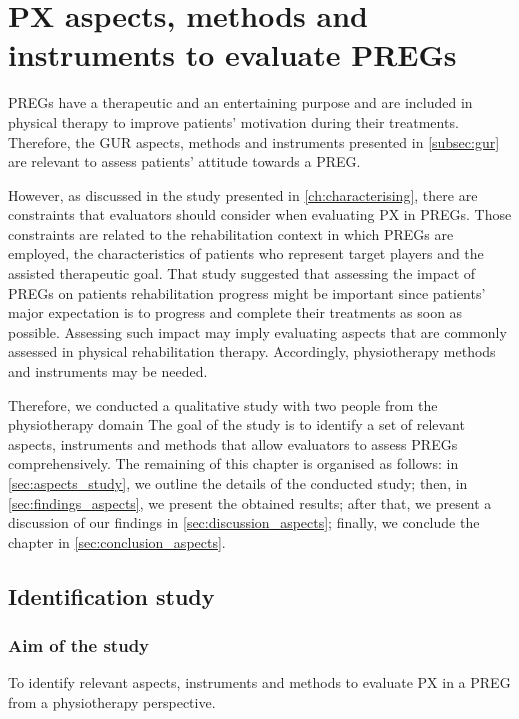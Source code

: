 \chapter{PX aspects, methods and instruments to evaluate PREGs}
\label{ch:aspects}

\acp{PREG} have a therapeutic and an entertaining purpose and are included in physical therapy to improve patients' motivation during their treatments. Therefore, the \ac{GUR} aspects, methods and instruments presented in \autoref{subsec:gur} are relevant to assess patients' attitude towards a \ac{PREG}.

However, as discussed in the study presented in \autoref{ch:characterising}, there are constraints that evaluators should consider when evaluating \ac{PX} in \acp{PREG}. Those constraints are related to the rehabilitation context in which \acp{PREG} are employed, the characteristics of patients who represent target players and the assisted therapeutic goal. That study suggested that assessing the impact of \acp{PREG} on patients rehabilitation progress might be important since patients' major expectation is to progress and complete their treatments as soon as possible. Assessing such impact may imply evaluating aspects that are commonly assessed in physical rehabilitation therapy. Accordingly, physiotherapy methods and instruments may be needed.

Therefore, we conducted a qualitative study with two people from the physiotherapy domain The goal of the study is to identify a set of relevant aspects, instruments and methods that allow evaluators to assess \acp{PREG} comprehensively. The remaining of this chapter is organised as follows: in \autoref{sec:aspects_study}, we outline the details of the conducted study; then, in \autoref{sec:findings_aspects}, we present the obtained results; after that, we present a discussion of our findings in \autoref{sec:discussion_aspects}; finally, we conclude the chapter in \autoref{sec:conclusion_aspects}.

\section{Identification study}\label{sec:aspects_study}
\subsection{Aim of the study}
To identify relevant aspects, instruments and methods to evaluate \ac{PX} in a \ac{PREG} from a physiotherapy perspective.

